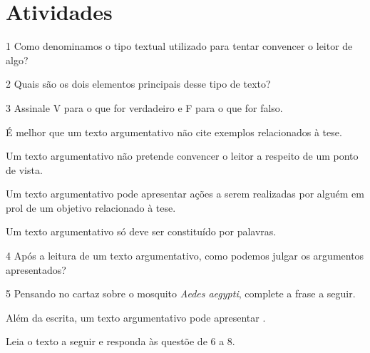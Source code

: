 \pagebreak
\section*{Atividades}

\num{1} Como denominamos o tipo textual utilizado para tentar convencer o leitor
de algo?


\num{2} Quais são os dois elementos principais desse tipo de texto?


\num{3} Assinale V para o que for verdadeiro e F para o que for falso.

\begin{boxlist}
 É melhor que um texto argumentativo não cite exemplos relacionados à tese.

 Um texto argumentativo não pretende convencer o leitor a respeito de
um ponto de vista.

 Um texto argumentativo pode apresentar ações a serem realizadas por alguém em prol de um objetivo relacionado à tese.

 Um texto argumentativo só deve ser constituído por palavras.
\end{boxlist}

\num{4} Após a leitura de um texto argumentativo, como podemos julgar os argumentos apresentados?


\num{5} Pensando no cartaz sobre o mosquito \textit{Aedes aegypti}, complete a frase a seguir.

\bigskip
\bigskip
\bigskip

\noindent{}Além da escrita, um texto argumentativo pode apresentar .

\pagebreak

\noindent{}Leia o texto a seguir e responda às questõe de 6 a 8.

